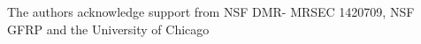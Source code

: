 \documentclass[amsmath,preprintnumbers,10pt,nofootinbib,prl,twocolumn]{revtex4-1}
\begin{document}
The authors acknowledge support from NSF DMR-
MRSEC  1420709, NSF GFRP and the  University  of  Chicago
 
%
\end{document}
